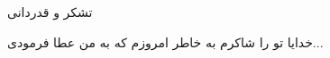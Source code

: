 \clearpage
\thispagestyle{empty}

{\BZarScaleOne
{\fontsize{20pt}{0}\selectfont
\noindent
تشکر و قدردانی
}}
\vspace{0.5cm}

{\BZarScaleOne
{\fontsize{12pt}{0.9cm}\selectfont %
\noindent
خدایا تو را شاکرم به خاطر امروزم که به من عطا فرمودی...






}}

\restoregeometry